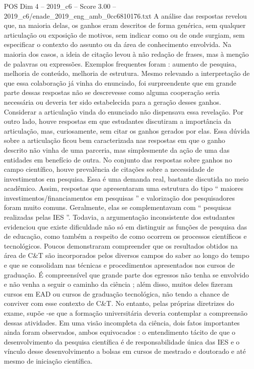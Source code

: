 \begin{textsample}{POS Dim 4 – 2019\_c6 – Score 3.00 – 2019\_c6/enade\_2019\_eng\_amb\_0cc6810176.txt}
A análise das respostas revelou que, na maioria delas, os ganhos eram descritos de forma genérica, sem qualquer articulação ou exposição de motivos, sem indicar como ou de onde surgiam, sem especificar o contexto do assunto ou da área de conhecimento envolvida.
Na maioria dos casos, a ideia de citação levou à não redação de frases, mas à menção de palavras ou expressões.
Exemplos frequentes foram : aumento de pesquisa, melhoria de conteúdo, melhoria de estrutura.
Mesmo relevando a interpretação de que essa colaboração já vinha do enunciado, foi surpreendente que em grande parte dessas respostas não se descrevesse como alguma cooperação seria necessária ou deveria ter sido estabelecida para a geração desses ganhos.
Considerar a articulação vinda do enunciado não dispensava essa revelação.
Por outro lado, houve respostas em que estudantes discutiram a importância da articulação, mas, curiosamente, sem citar os ganhos gerados por elas.
Essa dúvida sobre a articulação ficou bem caracterizada nas respostas em que o ganho descrito não vinha de uma parceria, mas simplesmente da ação de uma das entidades em benefício de outra.
No conjunto das respostas sobre ganhos no campo científico, houve prevalência de citações sobre a necessidade de investimentos em pesquisa.
Essa é uma demanda real, bastante discutida no meio acadêmico.
Assim, respostas que apresentaram uma estrutura do tipo “ maiores investimentos/financiamentos em pesquisas ” e valorização dos pesquisadores foram muito comuns.
Geralmente, elas se complementavam com “ pesquisas realizadas pelas IES ”.
Todavia, a argumentação inconsistente dos estudantes evidenciou que existe dificuldade não só em distinguir as funções de pesquisa das de educação, como também a respeito de como ocorrem os processos científicos e tecnológicos.
Poucos demonstraram compreender que os resultados obtidos na área de C\&T são incorporados pelos diversos campos do saber ao longo do tempo e que se consolidam nas técnicas e procedimentos apresentados nos cursos de graduação.
É compreensível que grande parte dos egressos não tenha se envolvido e não venha a seguir o caminho da ciência ; além disso, muitos deles fizeram cursos em EAD ou cursos de graduação tecnológica, não tendo a chance de conviver com esse contexto de C\&T.
No entanto, pelas próprias diretrizes do exame, supõe -se que a formação universitária deveria contemplar a compreensão dessas atividades.
Em uma visão incompleta da ciência, dois fatos importantes ainda foram observados, ambos equivocados : o entendimento tácito de que o desenvolvimento da pesquisa científica é de responsabilidade única das IES e o vínculo desse desenvolvimento a bolsas em cursos de mestrado e doutorado e até mesmo de iniciação científica.

\end{textsample}
